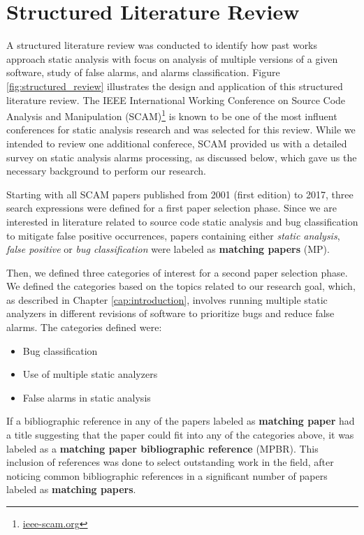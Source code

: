 \chapter{Structured Literature Review}
\label{ch:literature}

A structured literature review was conducted to identify how past works
approach static analysis with focus on analysis of multiple versions of a given
software, study of false alarms, and alarms classification. Figure
\ref{fig:structured_review} illustrates the design and application of this
structured literature review. The IEEE International Working Conference on
Source Code Analysis and Manipulation (SCAM)\footnote{\url{ieee-scam.org}} is
known to be one of the most influent conferences for static analysis research
and was selected for this review. While we intended to review one additional
conferece, SCAM provided us with a detailed survey on static analysis alarms
processing, as discussed below, which gave us the necessary background to
perform our research.



Starting with all SCAM papers published from 2001 (first edition) to 2017,
three search expressions were defined for a first paper selection phase. Since
we are interested in literature related to source code static analysis and  bug
classification to mitigate false positive occurrences, papers containing either
\textit{static analysis}, \textit{false positive} or \textit{bug
classification} were labeled as \textbf{matching papers} (MP).

Then, we defined three categories of interest for a second paper selection
phase. We defined the categories based on the topics related to our research
goal, which, as described in Chapter \ref{cap:introduction}, involves running
multiple static analyzers in different revisions of software to prioritize bugs
and reduce false alarms. The categories defined were:

\begin{itemize}
\item Bug classification
\item Use of multiple static analyzers
\item False alarms in static analysis
\end{itemize}

If a bibliographic reference in any of the papers labeled as \textbf{matching
paper} had a title suggesting that the paper could fit into any of the
categories above, it was labeled as a \textbf{matching paper bibliographic
reference} (MPBR). This inclusion of references was done to select outstanding work in the field,
after noticing common bibliographic references in a significant number of
papers labeled as \textbf{matching papers}.

